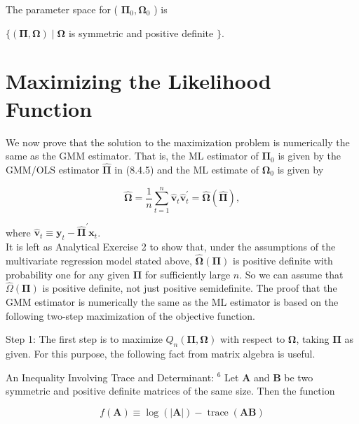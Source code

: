 \documentclass[10pt]{article}
\begin{document}
The parameter space for ( $\boldsymbol{\Pi}_{0}, \boldsymbol{\Omega}_{0}$ ) is

\begin{displayquote}
$\{(\boldsymbol{\Pi}, \boldsymbol{\Omega}) \mid \boldsymbol{\Omega}$ is symmetric and positive definite $\}$.
\end{displayquote}

\section*{Maximizing the Likelihood Function}
We now prove that the solution to the maximization problem is numerically the same as the GMM estimator. That is, the ML estimator of $\boldsymbol{\Pi}_{0}$ is given by the GMM/OLS estimator $\widehat{\boldsymbol{\Pi}}$ in (8.4.5) and the ML estimate of $\boldsymbol{\Omega}_{0}$ is given by


\begin{equation*}
\widehat{\boldsymbol{\Omega}}=\frac{1}{n} \sum_{t=1}^{n} \hat{\mathbf{v}}_{t} \hat{\mathbf{v}}_{t}^{\prime}=\widehat{\boldsymbol{\Omega}}(\widehat{\boldsymbol{\Pi}}), \tag{8.4.12}
\end{equation*}


where $\hat{\mathbf{v}}_{t} \equiv \mathbf{y}_{t}-\widehat{\boldsymbol{\Pi}}^{\prime} \mathbf{x}_{t}$.\\
It is left as Analytical Exercise 2 to show that, under the assumptions of the multivariate regression model stated above, $\widehat{\boldsymbol{\Omega}}(\boldsymbol{\Pi})$ is positive definite with probability one for any given $\boldsymbol{\Pi}$ for sufficiently large $n$. So we can assume that $\widehat{\Omega}(\boldsymbol{\Pi})$ is positive definite, not just positive semidefinite. The proof that the GMM estimator is numerically the same as the ML estimator is based on the following two-step maximization of the objective function.

Step 1: The first step is to maximize $Q_{n}(\boldsymbol{\Pi}, \boldsymbol{\Omega})$ with respect to $\boldsymbol{\Omega}$, taking $\boldsymbol{\Pi}$ as given. For this purpose, the following fact from matrix algebra is useful.

An Inequality Involving Trace and Determinant: ${ }^{6}$ Let $\mathbf{A}$ and $\mathbf{B}$ be two symmetric and positive definite matrices of the same size. Then the function

$$
f(\mathbf{A}) \equiv \log (|\mathbf{A}|)-\operatorname{trace}(\mathbf{A B})
$$
\end{document}
